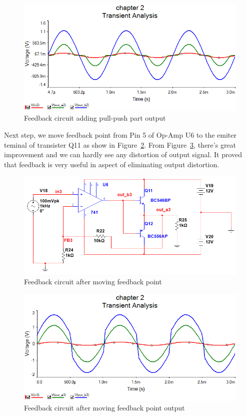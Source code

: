 \begin{figure}[htbp]
	\centering
	\includegraphics[scale=0.7]{"../Photo/Chap2/Feedback_ini_before_data"}
	\caption{Feedback circuit adding pull-push part output}
	\label{fig:Feedback before data}
\end{figure}

Next step, we move feedback point from Pin 5 of Op-Amp U6 to the emiter teminal of transister Q11 as show in Figure~\ref{fig:Feedback after}. From Figure~\ref{fig:Feedback after data}, there's great improvement and we can hardly see any distortion of output signal. It proved that feedback is very useful in aspect of eliminating output distortion.


\begin{figure}[htbp]
	\centering
	\includegraphics[scale=0.6]{"../Photo/Chap2/Feed_back_ini_after"}
	\caption{Feedback circuit after moving feedback point}
	\label{fig:Feedback after}
\end{figure}

\begin{figure}[htbp]
	\centering
	\includegraphics[scale=0.6]{"../Photo/Chap2/Feedback_ini_after_data"}
	\caption{Feedback circuit after moving feedback point output}
	\label{fig:Feedback after data}
\end{figure}


